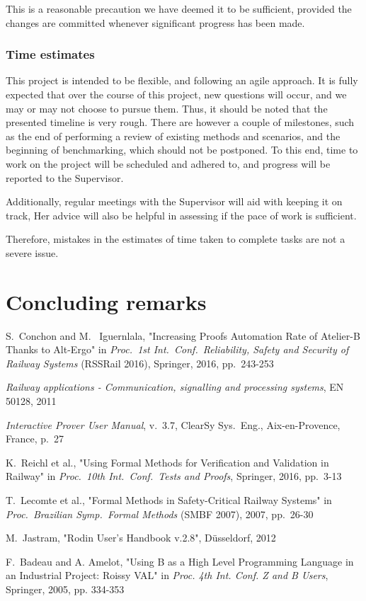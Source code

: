 \documentclass[11pt,journal]{IEEEtran}
\begin{document}
	This is a reasonable precaution we have deemed it to be sufficient, provided the changes are committed whenever significant progress has been made.
	
	\subsubsection{Time estimates}
	This project is intended to be flexible, and following an agile approach. It is fully expected that over the course of this project, new questions will occur, and we may or may not choose to pursue them. Thus, it should be noted that the presented timeline is very rough. There are however a couple of milestones, such as the end of performing a review of existing methods and scenarios, and the beginning of benchmarking, which should not be postponed. To this end, time to work on the project will be scheduled and adhered to, and progress will be reported to the Supervisor.
	
	Additionally, regular meetings with the Supervisor will aid with keeping it on track, Her advice will also be helpful in assessing if the pace of work is sufficient.
	
	Therefore, mistakes in the estimates of time taken to complete tasks are not a severe issue.
	
	\section{Concluding remarks}
	
	\IEEEPARstart{}{} 
	
	\begin{thebibliography}{1}
		S.~Conchon and M.~ Iguernlala, "Increasing Proofs Automation Rate	of Atelier-B Thanks to Alt-Ergo" in \emph{Proc.~1st Int.~Conf.~Reliability, Safety and Security of Railway Systems} (RSSRail 2016), Springer, 2016, pp.~243-253
		
		\emph{Railway applications - Communication, signalling and processing systems}, EN 50128, 2011
		
		\emph{Interactive Prover User Manual}, v.~3.7, ClearSy Sys.~Eng., Aix-en-Provence, France, p.~27
		
		K.~Reichl et al., "Using Formal Methods for Verification and Validation in Railway" in \emph{Proc.~10th Int.~Conf.~Tests and Proofs}, Springer, 2016, pp.~3-13
		
		T.~Lecomte et al., "Formal Methods in Safety-Critical Railway Systems" in \emph{Proc.~Brazilian Symp.~Formal Methods} (SMBF 2007), 2007, pp.~26-30
		
		M.~Jastram, "Rodin User's Handbook v.2.8", D\"{u}sseldorf, 2012
		
		F.~Badeau and A. Amelot, "Using B as a High Level Programming Language in an Industrial Project: Roissy VAL" in \emph{Proc. 4th Int. Conf. Z and B Users}, Springer, 2005, pp. 334-353
		
		
	\end{thebibliography}
	
\end{document}
